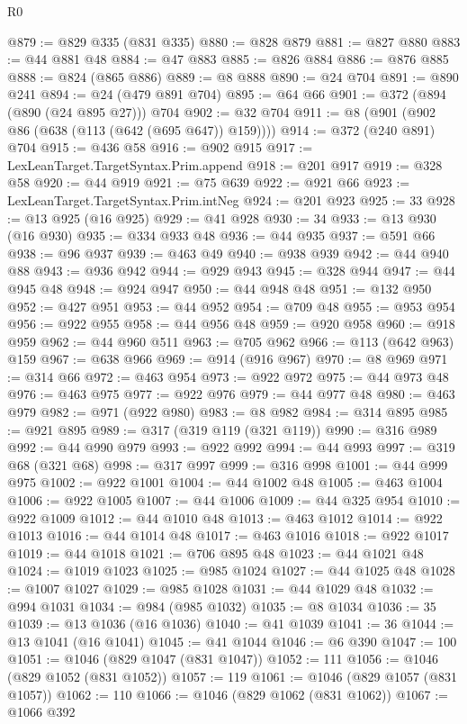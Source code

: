 \begin{lexlean}{R0}
\begin{coremodule}
{{{{{{{{{{{{{{{{{{{{{{{{{{{{{{{{{{{{{{{{{{{{{{{{{{{{{{{{{{{{{{{{{{{{{{{{{@879 := @829 @335 (@831 @335)
@880 := @828 @879
@881 := @827 @880
@883 := @44 @881 @48
@884 := @47 @883
@885 := @826 @884
@886 := @876 @885
@888 := @824 (@865 @886)
@889 := @8 @888
@890 := @24 @704
@891 := @890 @241
@894 := @24 (@479 @891 @704)
@895 := @64 @66
@901 := @372 (@894 (@890 (@24 @895 @27))) @704
@902 := @32 @704
@911 := @8 (@901 (@902 @86 (@638 (@113 (@642 (@695 @647)) @159))))
@914 := @372 (@240 @891) @704
@915 := @436 @58
@916 := @902 @915
@917 := LexLeanTarget.TargetSyntax.Prim.append
@918 := @201 @917
@919 := @328 @58
@920 := @44 @919
@921 := @75 @639
@922 := @921 @66
@923 := LexLeanTarget.TargetSyntax.Prim.intNeg
@924 := @201 @923
@925 := 33
@928 := @13 @925 (@16 @925)
@929 := @41 @928
@930 := 34
@933 := @13 @930 (@16 @930)
@935 := @334 @933 @48
@936 := @44 @935
@937 := @591 @66
@938 := @96 @937
@939 := @463 @49
@940 := @938 @939
@942 := @44 @940 @88
@943 := @936 @942
@944 := @929 @943
@945 := @328 @944
@947 := @44 @945 @48
@948 := @924 @947
@950 := @44 @948 @48
@951 := @132 @950
@952 := @427 @951
@953 := @44 @952
@954 := @709 @48
@955 := @953 @954
@956 := @922 @955
@958 := @44 @956 @48
@959 := @920 @958
@960 := @918 @959
@962 := @44 @960 @511
@963 := @705 @962
@966 := @113 (@642 @963) @159
@967 := @638 @966
@969 := @914 (@916 @967)
@970 := @8 @969
@971 := @314 @66
@972 := @463 @954
@973 := @922 @972
@975 := @44 @973 @48
@976 := @463 @975
@977 := @922 @976
@979 := @44 @977 @48
@980 := @463 @979
@982 := @971 (@922 @980)
@983 := @8 @982
@984 := @314 @895
@985 := @921 @895
@989 := @317 (@319 @119 (@321 @119))
@990 := @316 @989
@992 := @44 @990 @979
@993 := @922 @992
@994 := @44 @993
@997 := @319 @68 (@321 @68)
@998 := @317 @997
@999 := @316 @998
@1001 := @44 @999 @975
@1002 := @922 @1001
@1004 := @44 @1002 @48
@1005 := @463 @1004
@1006 := @922 @1005
@1007 := @44 @1006
@1009 := @44 @325 @954
@1010 := @922 @1009
@1012 := @44 @1010 @48
@1013 := @463 @1012
@1014 := @922 @1013
@1016 := @44 @1014 @48
@1017 := @463 @1016
@1018 := @922 @1017
@1019 := @44 @1018
@1021 := @706 @895 @48
@1023 := @44 @1021 @48
@1024 := @1019 @1023
@1025 := @985 @1024
@1027 := @44 @1025 @48
@1028 := @1007 @1027
@1029 := @985 @1028
@1031 := @44 @1029 @48
@1032 := @994 @1031
@1034 := @984 (@985 @1032)
@1035 := @8 @1034
@1036 := 35
@1039 := @13 @1036 (@16 @1036)
@1040 := @41 @1039
@1041 := 36
@1044 := @13 @1041 (@16 @1041)
@1045 := @41 @1044
@1046 := @6 @390
@1047 := 100
@1051 := @1046 (@829 @1047 (@831 @1047))
@1052 := 111
@1056 := @1046 (@829 @1052 (@831 @1052))
@1057 := 119
@1061 := @1046 (@829 @1057 (@831 @1057))
@1062 := 110
@1066 := @1046 (@829 @1062 (@831 @1062))
@1067 := @1066 @392
}}}}}}}}}}}}}}}}}}}}}}}}}}}}}}}}}}}}}}}}}}}}}}}}}}}}}}}}}}}}}}}}}}}}}}}}}
\end{coremodule}
\end{lexlean}
